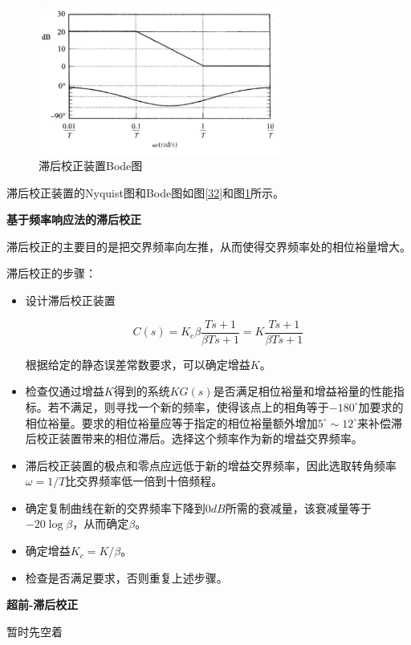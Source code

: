 \begin{figure}[!ht]
    \centering
    \includegraphics[width=8cm]{figures/33.png}
    \caption{滞后校正装置Bode图}
    \label{33}
\end{figure}

滞后校正装置的Nyquist图和Bode图如图\ref{32}和图\ref{33}所示。

\textbf{基于频率响应法的滞后校正}

滞后校正的主要目的是把交界频率向左推，从而使得交界频率处的相位裕量增大。

滞后校正的步骤：

\begin{itemize}
    \item 设计滞后校正装置
    
    \begin{equation*}
        C(s)=K_c\beta\frac{Ts+1}{\beta Ts+1}=K\frac{Ts+1}{\beta Ts+1}
    \end{equation*}

    根据给定的静态误差常数要求，可以确定增益$K$。

    \item 检查仅通过增益$K$得到的系统$KG(s)$是否满足相位裕量和增益裕量的性能指标。若不满足，则寻找一个新的频率，使得该点上的相角等于$-180^\circ$加要求的相位裕量。要求的相位裕量应等于指定的相位裕量额外增加$5^\circ\sim 12^\circ$来补偿滞后校正装置带来的相位滞后。选择这个频率作为新的增益交界频率。
    \item 滞后校正装置的极点和零点应远低于新的增益交界频率，因此选取转角频率$\omega=1/T$比交界频率低一倍到十倍频程。
    \item 确定复制曲线在新的交界频率下降到$0dB$所需的衰减量，该衰减量等于$-20\log\beta$，从而确定$\beta$。
    \item 确定增益$K_c=K/\beta$。
    \item 检查是否满足要求，否则重复上述步骤。
\end{itemize}

\textbf{超前-滞后校正}

暂时先空着